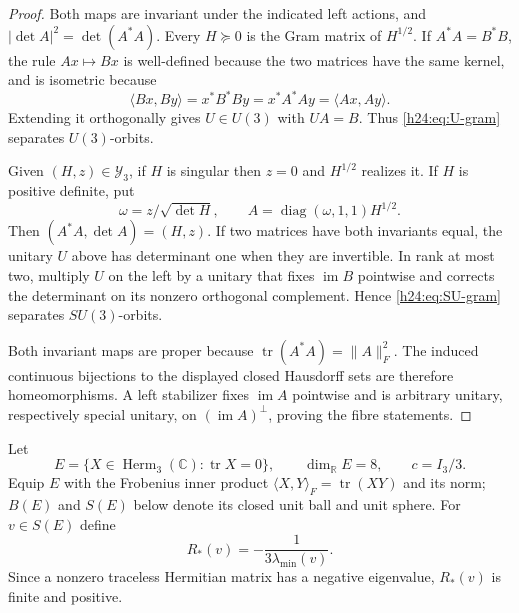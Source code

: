 \begin{proof}
Both maps are invariant under the indicated left actions, and
$|\det A|^2=\det(A^*A)$.  Every $H\succeq0$ is the Gram matrix of
$H^{1/2}$.  If $A^*A=B^*B$, the rule $Ax\mapsto Bx$ is well-defined because
the two matrices have the same kernel, and is isometric because
\[
 \langle Bx,By\rangle=x^*B^*By=x^*A^*Ay=\langle Ax,Ay\rangle.
\]
Extending it orthogonally gives $U\in U(3)$ with $UA=B$.  Thus
\eqref{h24:eq:U-gram} separates $U(3)$-orbits.

Given $(H,z)\in\mathcal Y_3$, if $H$ is singular then $z=0$ and
$H^{1/2}$ realizes it.  If $H$ is positive definite, put
\[
 \omega=z/\sqrt{\det H},\qquad
 A=\operatorname{diag}(\omega,1,1)H^{1/2}.
\]
Then $(A^*A,\det A)=(H,z)$.  If two matrices have both invariants equal,
the unitary $U$ above has determinant one when they are invertible.  In
rank at most two, multiply $U$ on the left by a unitary that fixes
$\operatorname{im} B$ pointwise and corrects the determinant on its nonzero orthogonal
complement.  Hence \eqref{h24:eq:SU-gram} separates $SU(3)$-orbits.

Both invariant maps are proper because $\operatorname{tr}(A^*A)=\|A\|_F^2$.  The induced
continuous bijections to the displayed closed Hausdorff sets are therefore
homeomorphisms.  A left stabilizer fixes $\operatorname{im} A$ pointwise and is arbitrary
unitary, respectively special unitary, on $(\operatorname{im} A)^\perp$, proving the
fibre statements.
\end{proof}

Let
\[
 E=\{X\in\operatorname{Herm}_3(\mathbb C):\operatorname{tr} X=0\},\qquad \dim_{\mathbb R}E=8,\qquad c=I_3/3.
\]
Equip $E$ with the Frobenius inner product
$\langle X,Y\rangle_F=\operatorname{tr}(XY)$ and its norm; $B(E)$ and $S(E)$ below
denote its closed unit ball and unit sphere.
For $v\in S(E)$ define
\begin{equation}
 R_*(v)=-\frac{1}{3\lambda_{\min}(v)}.
 \label{h24:eq:radial-length}
\end{equation}
Since a nonzero traceless Hermitian matrix has a negative eigenvalue,
$R_*(v)$ is finite and positive.



